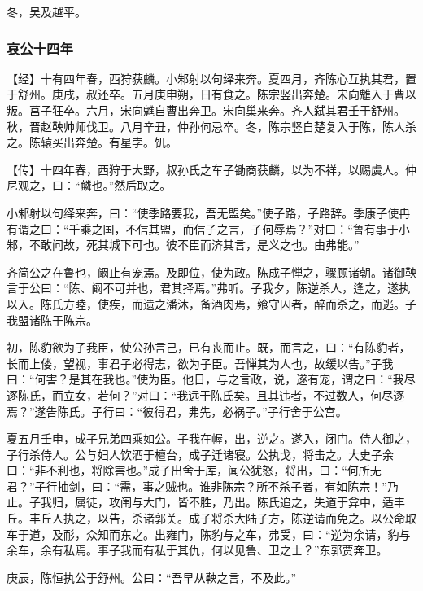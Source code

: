 \documentclass[]{article}
\begin{document}
冬，吴及越平。

\hypertarget{header-n3190}{%
\subsubsection{哀公十四年}\label{header-n3190}}

【经】十有四年春，西狩获麟。小邾射以句绎来奔。夏四月，齐陈心互执其君，置于舒州。庚戌，叔还卒。五月庚申朔，日有食之。陈宗竖出奔楚。宋向魋入于曹以叛。莒子狂卒。六月，宋向魋自曹出奔卫。宋向巢来奔。齐人弑其君壬于舒州。秋，晋赵鞅帅师伐卫。八月辛丑，仲孙何忌卒。冬，陈宗竖自楚复入于陈，陈人杀之。陈辕买出奔楚。有星孛。饥。

【传】十四年春，西狩于大野，叔孙氏之车子锄商获麟，以为不祥，以赐虞人。仲尼观之，曰：``麟也。''然后取之。

小邾射以句绎来奔，曰：``使季路要我，吾无盟矣。''使子路，子路辞。季康子使冉有谓之曰：``千乘之国，不信其盟，而信子之言，子何辱焉？''对曰：``鲁有事于小邾，不敢问故，死其城下可也。彼不臣而济其言，是义之也。由弗能。''

齐简公之在鲁也，阚止有宠焉。及即位，使为政。陈成子惮之，骤顾诸朝。诸御鞅言于公曰：``陈、阚不可并也，君其择焉。''弗听。子我夕，陈逆杀人，逢之，遂执以入。陈氏方睦，使疾，而遗之潘沐，备酒肉焉，飨守囚者，醉而杀之，而逃。子我盟诸陈于陈宗。

初，陈豹欲为子我臣，使公孙言己，已有丧而止。既，而言之，曰：``有陈豹者，长而上偻，望视，事君子必得志，欲为子臣。吾惮其为人也，故缓以告。''子我曰：``何害？是其在我也。''使为臣。他日，与之言政，说，遂有宠，谓之曰：``我尽逐陈氏，而立女，若何？''对曰：``我远于陈氏矣。且其违者，不过数人，何尽逐焉？''遂告陈氏。子行曰：``彼得君，弗先，必祸子。''子行舍于公宫。

夏五月壬申，成子兄弟四乘如公。子我在幄，出，逆之。遂入，闭门。侍人御之，子行杀侍人。公与妇人饮酒于檀台，成子迁诸寝。公执戈，将击之。大史子余曰：``非不利也，将除害也。''成子出舍于库，闻公犹怒，将出，曰：``何所无君？''子行抽剑，曰：``需，事之贼也。谁非陈宗？所不杀子者，有如陈宗！''乃止。子我归，属徒，攻闱与大门，皆不胜，乃出。陈氏追之，失道于弇中，适丰丘。丰丘人执之，以告，杀诸郭关。成子将杀大陆子方，陈逆请而免之。以公命取车于道，及耏，众知而东之。出雍门，陈豹与之车，弗受，曰：``逆为余请，豹与余车，余有私焉。事子我而有私于其仇，何以见鲁、卫之士？''东郭贾奔卫。

庚辰，陈恒执公于舒州。公曰：``吾早从鞅之言，不及此。''
\end{document}
